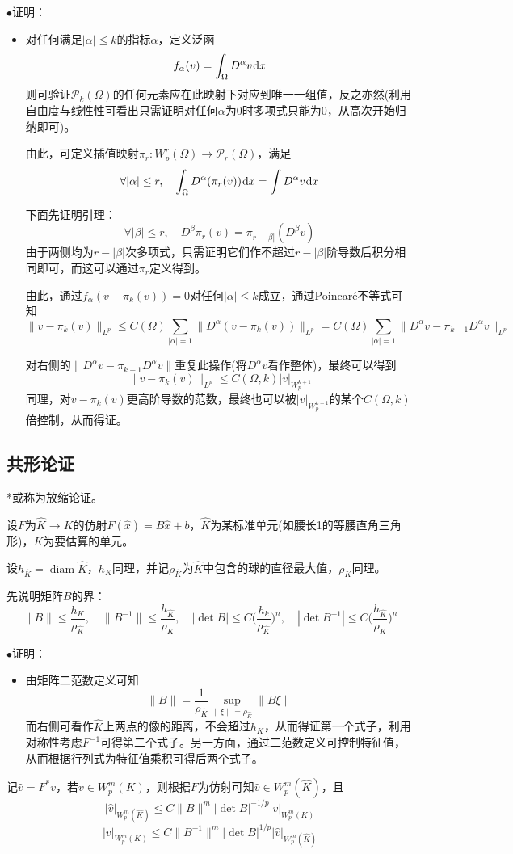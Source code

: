 \documentclass[a4paper,UTF8,fontset=windows]{ctexart}
\newcommand*{\dr}{\hspace{0.07em}\mathrm{d}}
\DeclareMathOperator*{\diam}{diam}
\newcommand*{\cp}{\mathcal{P}}
\newcommand{\proo}[1]{{\kaishu $\bullet$证明：
\begin{itemize}
    \item[] #1
\end{itemize}
}}
\begin{document}
\proo{
    对任何满足$|\alpha|\le k$的指标$\alpha$，定义泛函
    $$f_\alpha(v)=\int_\Omega D^\alpha v\dr x$$
    则可验证$\cp_k(\Omega)$的任何元素应在此映射下对应到唯一一组值，反之亦然(利用自由度与线性性可看出只需证明对任何$\alpha$为0时多项式只能为0，从高次开始归纳即可)。

    由此，可定义插值映射$\pi_r:W_p^r(\Omega)\to \cp_r(\Omega)$，满足
    $$\forall|\alpha|\le r,\quad\int_\Omega D^\alpha(\pi_r(v))\dr x=\int D^\alpha v\dr x$$

    下面先证明引理：
    $$\forall|\beta|\le r,\quad D^\beta\pi_r(v)=\pi_{r-|\beta|}(D^\beta v)$$
    由于两侧均为$r-|\beta|$次多项式，只需证明它们作不超过$r-|\beta|$阶导数后积分相同即可，而这可以通过$\pi_r$定义得到。

    由此，通过$f_\alpha(v-\pi_k(v))=0$对任何$|\alpha|\le k$成立，通过Poincar\'e不等式可知
    $$\|v-\pi_k(v)\|_{L^p}\le C(\Omega)\sum_{|\alpha|=1}\|D^\alpha(v-\pi_k(v))\|_{L^p}=C(\Omega)\sum_{|\alpha|=1}\|D^\alpha v-\pi_{k-1}D^\alpha v\|_{L^p}$$

    对右侧的$\|D^\alpha v-\pi_{k-1}D^\alpha v\|$重复此操作(将$D^\alpha v$看作整体)，最终可以得到
    $$\|v-\pi_k(v)\|_{L^p}\le C(\Omega,k)|v|_{W_p^{k+1}}$$
    同理，对$v-\pi_k(v)$更高阶导数的范数，最终也可以被$|v|_{W_p^{k+1}}$的某个$C(\Omega,k)$倍控制，从而得证。
}

\subsection{共形论证}
*或称为放缩论证。

设$F$为$\hat{K}\to K$的仿射$F(\hat{x})=B\hat{x}+b$，$\hat{K}$为某标准单元(如腰长1的等腰直角三角形)，$K$为要估算的单元。

设$h_{\hat{K}}=\diam\hat{K}$，$h_K$同理，并记$\rho_{\hat{K}}$为$\hat{K}$中包含的球的直径最大值，$\rho_K$同理。

先说明矩阵$B$的界：
$$\|B\|\le\frac{h_K}{\rho_{\hat{K}}},\quad\|B^{-1}\|\le\frac{h_{\hat{K}}}{\rho_K},\quad |\det B|\le C\bigg(\frac{h_k}{\rho_{\hat{K}}}\bigg)^n,\quad|\det B^{-1}|\le C\bigg(\frac{h_{\hat{K}}}{\rho_K}\bigg)^n$$

\proo{
    由矩阵二范数定义可知
    $$\|B\|=\frac{1}{\rho_{\hat{K}}}\sup_{\|\xi\|=\rho_{\hat{K}}}\|B\xi\|$$
    而右侧可看作$\hat{K}$上两点的像的距离，不会超过$h_K$，从而得证第一个式子，利用对称性考虑$F^{-1}$可得第二个式子。另一方面，通过二范数定义可控制特征值，从而根据行列式为特征值乘积可得后两个式子。
}

记$\hat{v}=F^*v$，若$v\in W_p^m(K)$，则根据$F$为仿射可知$\hat{v}\in W_p^m(\hat{K})$，且
$$|\hat{v}|_{W_p^m(\hat{K})}\le C\|B\|^m|\det B|^{-1/p}|v|_{W_p^m(K)}$$
$$|v|_{W_p^m(K)}\le C\|B^{-1}\|^m|\det B|^{1/p}|\hat{v}|_{W_p^m(\hat{K})}$$
\end{document}
